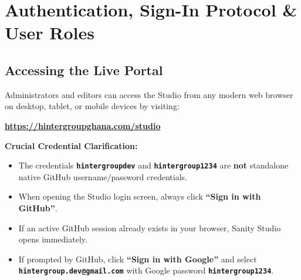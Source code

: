 \documentclass[11pt,a4paper,oneside]{book}
\begin{document}
\chapter{Authentication, Sign-In Protocol \& User Roles}
\label{chap:auth}

\section{Accessing the Live Portal}
Administrators and editors can access the Studio from any modern web browser on desktop, tablet, or mobile devices by visiting:
\begin{center}
  \Large\bfseries\url{https://hintergroupghana.com/studio}
\end{center}

\begin{goldbox}
\textbf{Crucial Credential Clarification:}
\begin{itemize}
  \item The credentials \textbf{\texttt{hintergroupdev}} and \textbf{\texttt{hintergroup1234}} are \textbf{not} standalone native GitHub username/password credentials.
  \item When opening the Studio login screen, always click \textbf{``Sign in with GitHub''}.
  \item If an active GitHub session already exists in your browser, Sanity Studio opens immediately.
  \item If prompted by GitHub, click \textbf{``Sign in with Google''} and select \textbf{\texttt{hintergroup.dev@gmail.com}} with Google password \textbf{\texttt{hintergroup1234}}.
\end{itemize}
\end{goldbox}
\end{document}
